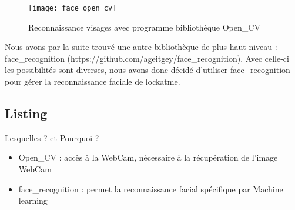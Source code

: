 \begin{figure}[h]
  \begin{center}
  \texttt{[image: face\_open\_cv]}
  \caption{Reconnaissance visages avec programme bibliothèque Open\_CV}
  \label{fig:face}
\end{center}
\end{figure}

\newpage

Nous avons par la suite trouvé une autre bibliothèque de plus haut niveau :
face\_recognition (https://github.com/ageitgey/face\_recognition). Avec celle-ci
les possibilités sont diverses, nous avons donc décidé d'utiliser face\_recognition
pour gérer la reconnaissance faciale de lockatme.

\subsection{Listing}
Lesquelles ? et Pourquoi ?
\\
  \begin{itemize}
    \item{Open\_CV : accès à la WebCam, nécessaire à la récupération de l'image
    WebCam}
    \item{face\_recognition : permet la reconnaissance facial spécifique par
    Machine learning}
  \end{itemize}

